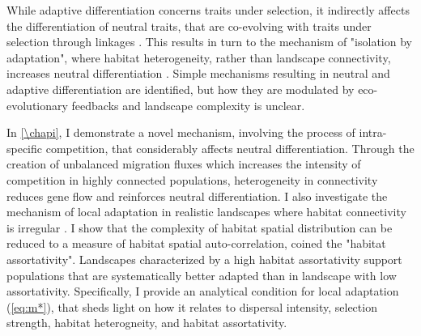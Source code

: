 % 
% 
While adaptive differentiation concerns traits under selection, it indirectly affects the differentiation of neutral traits, that are co-evolving with traits under selection through linkages \citep{Billiard2015,Lepers2021}. This results in turn to the mechanism of "isolation by adaptation", where habitat heterogeneity, rather than landscape connectivity, increases neutral differentiation \citep{nosil2008}. 
% 
Simple mechanisms resulting in neutral and adaptive differentiation are identified, but how they are modulated by eco-evolutionary feedbacks and landscape complexity is unclear. %

In \cref{\chapi}, I demonstrate a novel mechanism, involving the process of intra-specific competition, that considerably affects neutral differentiation. Through the creation of unbalanced migration fluxes which increases the intensity of competition in highly connected populations, heterogeneity in connectivity reduces gene flow and reinforces neutral differentiation. %
% 
I also investigate the mechanism of local adaptation in realistic landscapes where habitat connectivity is irregular \citep{Dale2010,LiebermanHauert2005}. I show that the complexity of habitat spatial distribution can be reduced to a measure of habitat spatial auto-correlation, coined the "habitat assortativity". Landscapes characterized by a high habitat assortativity support populations that are systematically better adapted than in landscape with low assortativity. Specifically, I provide an analytical condition for local adaptation  (\cref{eq:m*}), that sheds light on how it relates to dispersal intensity, selection strength, habitat heterogneity, and habitat assortativity.

